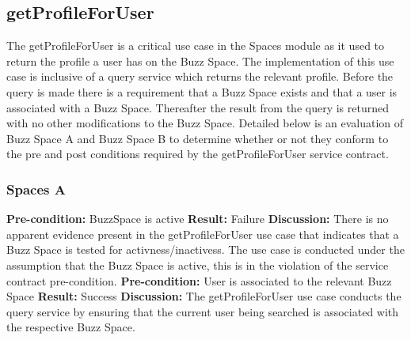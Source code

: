 
\newpage
\subsection{getProfileForUser}

The getProfileForUser is a critical use case in the Spaces module as it used to return the profile a user has on the Buzz Space. \newline
The implementation of this use case is inclusive of a query service which returns the relevant profile.\newline
Before the query is made there is a requirement that a Buzz Space exists and that a user is associated with a Buzz Space.\newline
Thereafter the result from the query is returned with no other modifications to the Buzz Space.\newline
Detailed below is an evaluation of Buzz Space A and Buzz Space B to determine whether or not they conform to the pre and post conditions required by the getProfileForUser service contract. 

\subsubsection{Spaces A}
\textbf{Pre-condition:}  BuzzSpace is active \newline
\textbf{Result:}  Failure \newline
\textbf{Discussion:}  There is no apparent evidence present in the getProfileForUser use case that indicates that a Buzz Space is tested for activness/inactivess.
The use case is conducted under the assumption that the Buzz Space is active, this is in the violation of the service contract pre-condition. \newline \newline
\textbf{Pre-condition:}  User is associated to the relevant Buzz Space\newline
\textbf{Result:}  Success \newline
\textbf{Discussion:}  The getProfileForUser use case conducts the query service by ensuring that the current user being searched is associated with the respective Buzz Space.
